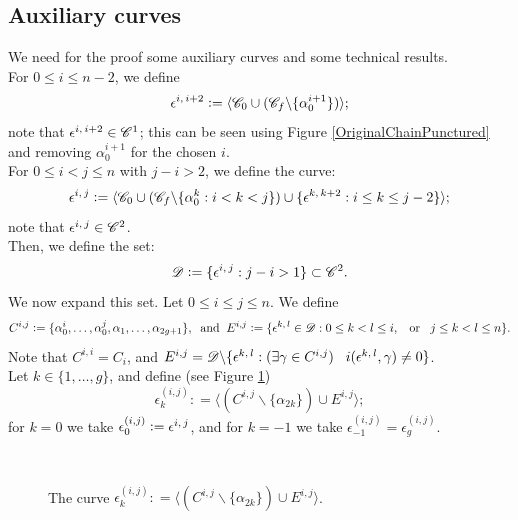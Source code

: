 \documentclass[twoside,11pt,a4paper]{article}
\newcommand*{\Cf}{\mathscr{C}}
\newcommand*{\Cfn}{\Cf_{0}}
\newcommand*{\Cff}{\Cf_{f}}
\newcommand*{\Df}{\mathscr{D}}
\newcommand*{\eps}[2]{\epsilon^{#1, \hspace{0.05cm} #2}}
\newcommand*{\epsp}[3]{\epsilon_{#1}^{(#2,#3)}}
\newcommand*{\ColonEqq}{\mathrel{\mathop:}=}
\begin{document}
\subsection{Auxiliary curves}\label{subsec5-2}
\indent We need for the proof some auxiliary curves and some technical results.\\[0.3cm]
\indent For $0 \leq i \leq n -2$, we define $$\eps{i}{i+2} \ColonEqq \langle\Cfn \cup (\Cff \backslash \{\alpha_{0}^{i+1}\})\rangle;$$ note that $\eps{i}{i+2} \in \Cf^{1}$; this can be seen using Figure \ref{OriginalChainPunctured} and removing $\alpha_{0}^{i+1}$ for the chosen $i$.\\
\indent For $0 \leq i < j \leq n$ with $j - i > 2$, we define the curve: $$\eps{i}{j} \ColonEqq \langle\Cfn \cup (\Cff \backslash \{\alpha_{0}^{k} : i < k < j\}) \cup \{\eps{k}{k+2} : i \leq k \leq j-2\}\rangle;$$ note that $\eps{i}{j} \in \Cf^{2}$.\\
\indent Then, we define the set: $$\Df \ColonEqq \{\eps{i}{j} : j-i > 1\} \subset \Cf^{2}.$$
\indent We now expand this set. Let $0 \leq i \leq j \leq n$. We define $$C^{i,j} \ColonEqq \{\alpha_{0}^{i}, \ldots, \alpha_{0}^{j}, \alpha_{1}, \ldots, \alpha_{2g+1}\}, \hspace{0.2cm} \mathrm{and} \hspace{0.2cm} E^{i,j} \ColonEqq \{\eps{k}{l} \in \Df : 0 \leq k < l \leq i, \hspace{0.3cm} \mathrm{or} \hspace{0.3cm} j \leq k < l \leq n\}.$$
\indent Note that $C^{i,i} = C_{i}$, and $E^{i,j} = \Df \backslash \{\eps{k}{l} : (\exists \gamma \in C^{i,j}) \hspace{0.3cm} i(\eps{k}{l}, \gamma) \neq 0\}$.\\
\indent Let $k \in \{1, \ldots, g\}$, and define (see Figure \ref{DefEpspfig1}) $$\epsp{k}{i}{j} \ColonEqq \langle (C^{i,j} \backslash \{\alpha_{2k}\}) \cup E^{i,j}\rangle;$$ for $k = 0$ we take $\epsp{0}{i}{j} \ColonEqq \eps{i}{j}$, and for $k = -1$ we take $\epsp{-1}{i}{j} = \epsp{g}{i}{j}$.
\begin{figure}[h]
 \begin{center}
  \resizebox{10cm}{!}{}\\[0.3cm]
  \resizebox{10cm}{!}{} \caption{The curve $\epsp{k}{i}{j} \ColonEqq \langle (C^{i,j} \backslash \{\alpha_{2k}\}) \cup E^{i,j}\rangle$.} \label{DefEpspfig1}
 \end{center}
\end{figure}\\
\end{document}
